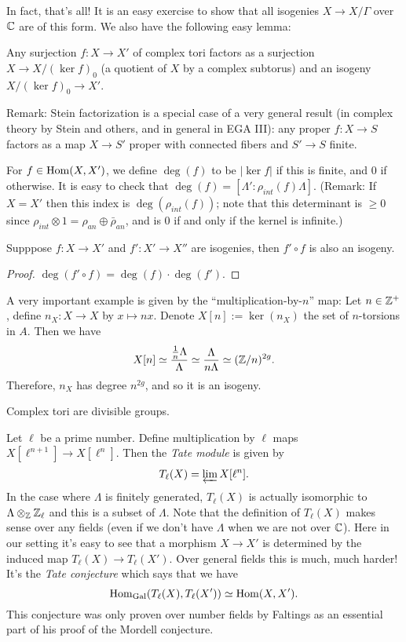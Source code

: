In fact, that's all! It is an easy exercise to show that all isogenies $X\to X/\Gamma$ over ${\mathbb C}$ are of this form. We also have the following easy lemma:

\begin{lemma}
Any surjection $f:X\to X'$ of complex tori factors as a surjection $X\to X/(\ker f)_0$ (a quotient of $X$ by a complex subtorus) and an isogeny $X/(\ker f)_0 \to X'$.
\end{lemma}

Remark: Stein factorization is a special case of a very general result (in complex theory by Stein and others, and in general in EGA III): any proper $f:X\to S$ factors as a map $X\to S'$ proper with connected fibers and $S'\to S$ finite. 
 
For $f\in \operatorname{Hom}(X,X')$, we define $\deg(f)$ to be $|\ker f|$ if this is finite, and $0$ if otherwise. It is easy to check that $\deg(f)=[\Lambda':\rho_{int}(f)\Lambda]$. (Remark: If $X=X'$ then this index is $\deg(\rho_{int}(f))$; note that this determinant is $\geq 0$ since $\rho_{int}\otimes 1 = \rho_{an}\oplus \bar{\rho}_{an}$, and is $0$ if and only if the kernel is infinite.)

\begin{lemma}
Supppose $f:X\to X'$ and $f':X'\to X''$ are isogenies, then $f'\circ f$ is also an isogeny. 
\end{lemma}

\begin{proof}
$\deg(f'\circ f)=\deg(f)\cdot \deg(f')$.
\end{proof}

A very important example is given by the ``multiplication-by-$n$'' map: Let $n\in {\mathbb Z}^+$, define 
$n_X:X\to X$ by $x\mapsto nx$. Denote $X[n]:=\ker(n_X)$ the set of $n$-torsions in $A$. Then we have
$$X[n]\simeq \frac{\frac{1}{n} \Lambda}{\Lambda}\simeq \frac{\Lambda}{n\Lambda}\simeq ({\mathbb Z}/n)^{2g}.$$
Therefore, $n_X$ has degree $n^{2g}$, and so it is an isogeny.

\begin{corollary}
Complex tori are divisible groups.
\end{corollary}


\begin{example}
Let $\ell$ be a prime number. Define multiplication by $\ell$ maps $X[\ell^{n+1}]\to X[\ell^n]$. Then the \emph{Tate module} is given by 
$$T_\ell(X)=\varprojlim X[\ell^n].$$
In the case where $\Lambda$ is finitely generated, $T_\ell(X)$ is actually isomorphic to $\Lambda\otimes_{\mathbb Z} {\mathbb Z}_\ell$ and this is a subset of $\Lambda$. 
Note that the definition of $T_\ell(X)$ makes sense over any fields (even if we don't have $\Lambda$ when we are not over ${\mathbb C}$). Here in our setting it's easy to see that a morphism $X\to X'$ is determined by the induced map $T_\ell(X)\to T_\ell(X')$. Over general fields this is much, much harder! It's the \emph{Tate conjecture} which says that we have 
$$\operatorname{Hom}_{\operatorname{Gal}}(T_\ell(X),T_\ell(X'))\simeq \operatorname{Hom}(X,X').$$
This conjecture was only proven over number fields by Faltings as an essential part of his proof of the Mordell conjecture. 
\end{example}



